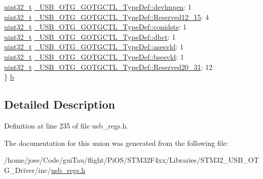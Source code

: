 \begin{DoxyCompactItemize}
\begin{tabbing}
\>\hyperlink{stdint_8h_a435d1572bf3f880d55459d9805097f62}{uint32\_t} \hyperlink{group___u_s_b___o_t_g___d_r_i_v_e_r_gac620352539abc5d73a05b0bbcde5d82b}{\_USB\_OTG\_GOTGCTL\_TypeDef::devhnpen}: 1\\
\>\hyperlink{stdint_8h_a435d1572bf3f880d55459d9805097f62}{uint32\_t} \hyperlink{group___u_s_b___o_t_g___d_r_i_v_e_r_gaf538e4adf72524cf22a00097b438703b}{\_USB\_OTG\_GOTGCTL\_TypeDef::Reserved12\_15}: 4\\
\>\hyperlink{stdint_8h_a435d1572bf3f880d55459d9805097f62}{uint32\_t} \hyperlink{group___u_s_b___o_t_g___d_r_i_v_e_r_gaadfa38aac8be616468845b5ae918cd37}{\_USB\_OTG\_GOTGCTL\_TypeDef::conidsts}: 1\\
\>\hyperlink{stdint_8h_a435d1572bf3f880d55459d9805097f62}{uint32\_t} \hyperlink{group___u_s_b___o_t_g___d_r_i_v_e_r_gab4cc914b75de1112a34a92d317e116e2}{\_USB\_OTG\_GOTGCTL\_TypeDef::dbct}: 1\\
\>\hyperlink{stdint_8h_a435d1572bf3f880d55459d9805097f62}{uint32\_t} \hyperlink{group___u_s_b___o_t_g___d_r_i_v_e_r_gad7e69d077d4bafb6706e8ffab731a615}{\_USB\_OTG\_GOTGCTL\_TypeDef::asesvld}: 1\\
\>\hyperlink{stdint_8h_a435d1572bf3f880d55459d9805097f62}{uint32\_t} \hyperlink{group___u_s_b___o_t_g___d_r_i_v_e_r_gaf855a8f6b69e3065e44e148d71cad9d9}{\_USB\_OTG\_GOTGCTL\_TypeDef::bsesvld}: 1\\
\>\hyperlink{stdint_8h_a435d1572bf3f880d55459d9805097f62}{uint32\_t} \hyperlink{group___u_s_b___o_t_g___d_r_i_v_e_r_ga2f71a4f5cc3e92d646e2488ba26e4e5c}{\_USB\_OTG\_GOTGCTL\_TypeDef::Reserved20\_31}: 12\\
\} \hyperlink{group___u_s_b___o_t_g___d_r_i_v_e_r_ga797875d71c7d04a7244f6b731623860c}{b}\\

\end{tabbing}\end{DoxyCompactItemize}


\subsection{Detailed Description}


Definition at line 235 of file usb\-\_\-regs.\-h.



The documentation for this union was generated from the following file\-:\begin{DoxyCompactItemize}
\item 
/home/jose/\-Code/gui\-Tau/flight/\-Pi\-O\-S/\-S\-T\-M32\-F4xx/\-Libraries/\-S\-T\-M32\-\_\-\-U\-S\-B\-\_\-\-O\-T\-G\-\_\-\-Driver/inc/\hyperlink{_s_t_m32_f4xx_2_libraries_2_s_t_m32___u_s_b___o_t_g___driver_2inc_2usb__regs_8h}{usb\-\_\-regs.\-h}\end{DoxyCompactItemize}
